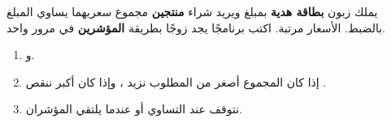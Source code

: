 \begin{statement}
يملك زبون \textbf{بطاقة هدية} بمبلغ  ويريد شراء \textbf{منتجين} مجموع سعريهما يساوي المبلغ بالضبط. الأسعار مرتبة. اكتب برنامجًا يجد زوجًا بطريقة \textbf{المؤشرين} في مرور واحد.
\end{statement}
\begin{stepsbox}\begin{enumerate}
\item {} و.
\item إذا كان المجموع أصغر من المطلوب نزيد ، وإذا كان أكبر ننقص .
\item نتوقف عند التساوي أو عندما يلتقي المؤشران.
\end{enumerate}\end{stepsbox}
